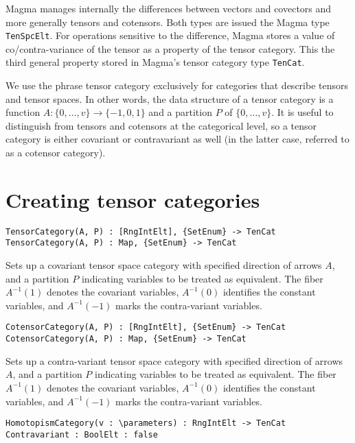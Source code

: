 Magma manages internally the differences between 
vectors and covectors and more generally tensors and cotensors.
Both types are issued the Magma type {\tt TenSpcElt}.
For operations sensitive to the difference, Magma stores a value of
co/contra-variance of the tensor as a property of the tensor category.
This the third general property stored in Magma's tensor category type
{\tt TenCat}.

We use the phrase tensor category exclusively for categories that describe tensors and tensor spaces.
In other words, the data structure of a tensor category is a function 
$A:\{0,\dots,v\}\rightarrow \{-1,0,1\}$ and a partition $P$ of $\{0,\dots,v\}$.
It is useful to distinguish from tensors and cotensors at the categorical level,
so a tensor category is either covariant or contravariant as well 
(in the latter case, referred to as a cotensor category).

\section{Creating tensor categories}
\color{blue}
{\small \begin{verbatim}
TensorCategory(A, P) : [RngIntElt], {SetEnum} -> TenCat
TensorCategory(A, P) : Map, {SetEnum} -> TenCat
\end{verbatim} }
\color{black}

Sets up a covariant tensor space category with specified direction of
arrows $A$, and a partition $P$ indicating variables to be treated as
equivalent.  The fiber $A^{-1}(1)$ denotes the covariant variables,
$A^{-1}(0)$ identifies the constant variables, and $A^{-1}(-1)$ marks
the contra-variant variables.  

\color{blue}
{\small \begin{verbatim}
CotensorCategory(A, P) : [RngIntElt], {SetEnum} -> TenCat
CotensorCategory(A, P) : Map, {SetEnum} -> TenCat
\end{verbatim} }
\color{black}

Sets up a contra-variant tensor space category with specified direction of
arrows $A$, and a partition $P$ indicating variables to be treated as
equivalent.  The fiber $A^{-1}(1)$ denotes the covariant variables,
$A^{-1}(0)$ identifies the constant variables, and $A^{-1}(-1)$ marks
the contra-variant variables.  

\color{blue}
{\small \begin{verbatim}
HomotopismCategory(v : \parameters) : RngIntElt -> TenCat
Contravariant : BoolElt : false
\end{verbatim} }
\color{black}

